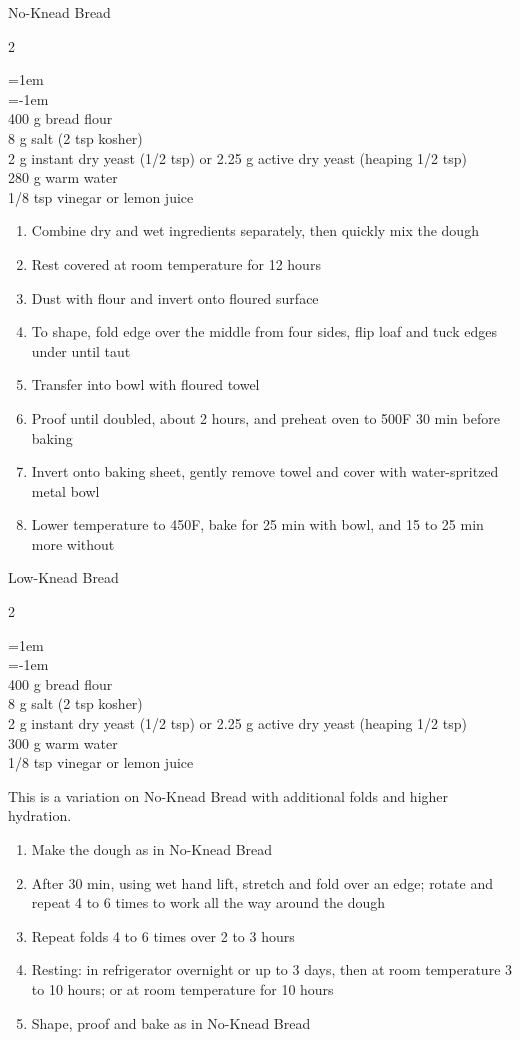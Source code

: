 \documentclass{article}
\newenvironment{recipe}[2]
    {\clearpage
    \begin{FlushLeft}
    \textrm{{\large#1}\hfill{\large\tabularnums{#2}}}
    \vspace{0.5em}
    \columnratio{0.333}
    \setlength{\columnsep}{0.2in}
    \begin{paracol}{2}}
    {\end{paracol}\end{FlushLeft}}
\newenvironment{denserecipe}[2]
    {\small
    \begin{recipe}{#1}{#2}}
    {\end{recipe}}
\newcommand{\nextcolumn}{\switchcolumn}
\newenvironment{ingredients}
    {
    \begin{obeylines}
    \vspace{\parskip}
    \setlength{\parskip}{0.25em}
    \vspace{-0.25em}
    \leftskip=1em
    \parindent=-1em}
    {\end{obeylines}}
\newenvironment{steps}
    {\begin{enumerate}[leftmargin=*,topsep=0pt]}
    {\end{enumerate}}
\newcommand{\fahrenheit}[1]{#1\textdegree{}F}
\newcommand{\tag}[1]{\hspace{1em}#1}
\newcommand{\symboltag}[2]{\tag{#1\hspace{0.4em}#2}}
\newcommand{\totaltime}[1]{\symboltag{\raisebox{-0.1em}{\small\StopWatchEnd}}{#1}}
\begin{document}
\begin{denserecipe}{No-Knead Bread}{\tag{VG}\totaltime{14 h}}
\begin{ingredients}
400 g bread flour
8 g salt (2 tsp kosher)
2 g instant dry yeast (1/2 tsp) or 2.25 g active dry yeast (heaping 1/2 tsp)
280 g warm water
1/8 tsp vinegar or lemon juice
\end{ingredients}
\nextcolumn
\begin{steps}
    \item Combine dry and wet ingredients separately, then quickly mix the dough
    \item Rest covered at room temperature for 12 hours
    \item Dust with flour and invert onto floured surface
    \item To shape, fold edge over the middle from four sides, flip loaf and tuck edges under until taut
    \item Transfer into bowl with floured towel
    \item Proof until doubled, about 2 hours, and preheat oven to \fahrenheit{500} 30 min before baking
    \item Invert onto baking sheet, gently remove towel and cover with water-spritzed metal bowl
    \item Lower temperature to \fahrenheit{450}, bake for 25 min with bowl, and 15 to 25 min more without
\end{steps}
\end{denserecipe}

\begin{denserecipe}{Low-Knead Bread}{\tag{VG}\totaltime{14 h to 3 days}}
\begin{ingredients}
400 g bread flour
8 g salt (2 tsp kosher)
2 g instant dry yeast (1/2 tsp) or 2.25 g active dry yeast (heaping 1/2 tsp)
300 g warm water
1/8 tsp vinegar or lemon juice
\end{ingredients}
\nextcolumn
This is a variation on No-Knead Bread with additional folds and higher hydration.
\begin{steps}
    \item Make the dough as in No-Knead Bread
    \item After 30 min, using wet hand lift, stretch and fold over an edge; rotate and repeat 4 to 6 times to work all the way around the dough
    \item Repeat folds 4 to 6 times over 2 to 3 hours
    \item Resting: in refrigerator overnight or up to 3 days, then at room temperature 3 to 10 hours; or at room temperature for 10 hours
    \item Shape, proof and bake as in No-Knead Bread
\end{steps}
\end{denserecipe}
\end{document}
